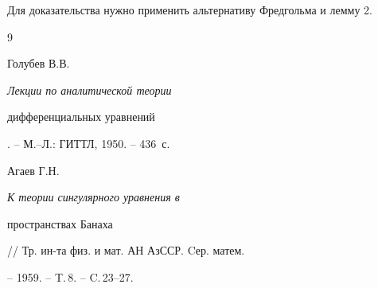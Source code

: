 Для доказательства нужно применить альтернативу Фредгольма и лемму 2.





\begin{thebibliography}{9}







Голубев В.В. {\em Лекции по аналитической теории


дифференциальных уравнений}. -- М.--Л.: ГИТТЛ, 1950. -- 436~с.




Агаев Г.Н. {\em К теории сингулярного уравнения в


пространствах Банаха} // Тр. ин-та физ. и мат. АН АзССР. Cер. матем.


-- 1959. -- T.\,8. -- C.\,23--27.





\end{thebibliography}





\vskip 2cm









\smallskip









\label{end}








